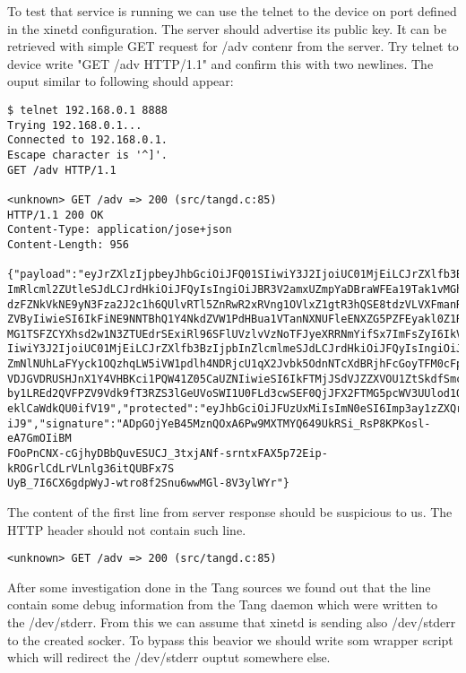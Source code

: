 To test that service is running we can use the telnet to the device on port defined in the xinetd configuration.
The server should advertise its public key.
It can be retrieved with simple GET request for /adv contenr from the server.
Try telnet to device write "GET /adv HTTP/1.1" and confirm this with two newlines.
The ouput similar to following should appear:
\begin{lstlisting}[columns=fixed,basicstyle=\ttfamily\footnotesize,tabsize=4,backgroundcolor=\color{yellow!10}]
$ telnet 192.168.0.1 8888
Trying 192.168.0.1...
Connected to 192.168.0.1.
Escape character is '^]'.
GET /adv HTTP/1.1

<unknown> GET /adv => 200 (src/tangd.c:85)
HTTP/1.1 200 OK
Content-Type: application/jose+json
Content-Length: 956

{"payload":"eyJrZXlzIjpbeyJhbGciOiJFQ01SIiwiY3J2IjoiUC01MjEiLCJrZXlfb3BzIjpb
ImRlcml2ZUtleSJdLCJrdHkiOiJFQyIsIngiOiJBR3V2amxUZmpYaDBraWFEa19Tak1vMGhYUm1R
dzFZNkVkNE9yN3Fza2J2c1h6QUlvRTl5ZnRwR2xRVng1OVlxZ1gtR3hQSE8tdzVLVXFmanRGQkVV
ZVByIiwieSI6IkFiNE9NNTBhQ1Y4NkdZVW1PdHBua1VTanNXNUFleENXZG5PZFEyakl0Z1RGNXNq
MG1TSFZCYXhsd2w1N3ZTUEdrSExiRl96SFlUVzlvVzNoTFJyeXRRNmYifSx7ImFsZyI6IkVTNTEy
IiwiY3J2IjoiUC01MjEiLCJrZXlfb3BzIjpbInZlcmlmeSJdLCJrdHkiOiJFQyIsIngiOiJBQVpS
ZmNlNUhLaFYyck1OQzhqLW5iVW1pdlh4NDRjcU1qX2Jvbk5OdnNTcXdBRjhFcGoyTFM0cFpfdUNR
VDJGVDRUSHJnX1Y4VHBKci1PQW41Z05CaUZNIiwieSI6IkFTMjJSdVJZZXVOU1ZtSkdfSmcwSW1n
by1LREd2QVFPZV9Vdk9fT3RZS3lGeUVoSWI1U0FLd3cwSEF0QjJFX2FTMG5pcWV3UUlod1QyanR5
eklCaWdkQU0ifV19","protected":"eyJhbGciOiJFUzUxMiIsImN0eSI6Imp3ay1zZXQranNvb
iJ9","signature":"ADpGOjYeB45MznQOxA6Pw9MXTMYQ649UkRSi_RsP8KPKosl-eA7GmOIiBM
FOoPnCNX-cGjhyDBbQuvESUCJ_3txjANf-srntxFAX5p72Eip-kROGrlCdLrVLnlg36itQUBFx7S
UyB_7I6CX6gdpWyJ-wtro8f2Snu6wwMGl-8V3ylWYr"}
\end{lstlisting}
The content of the first line from server response should be suspicious to us.
The HTTP header should not contain such line\cite{RFC2616}.
\begin{lstlisting}[columns=fixed,basicstyle=\ttfamily\footnotesize,tabsize=4,backgroundcolor=\color{yellow!10}]
<unknown> GET /adv => 200 (src/tangd.c:85)
\end{lstlisting}
After some investigation done in the Tang sources we found out that the line contain some debug information from the Tang daemon which were written to the /dev/stderr.
From this we can assume that xinetd is sending also /dev/stderr to the created socker.
To bypass this beavior we should write som wrapper script which will redirect the /dev/stderr ouptut somewhere else.

